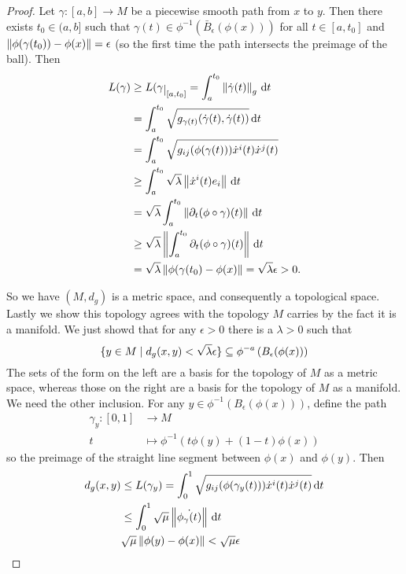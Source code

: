 \documentclass[12pt,twoside]{book}
\begin{document}
\begin{proof}
	Let \( \gamma \colon [a,b] \to M \)	be a piecewise smooth path from \( x \) to \( y
	\). Then there exists \( t_0 \in (a,b] \) such that \( \gamma(t) \in
	\phi^{-1}\left(\bar{B}_\epsilon(\phi(x))\right) \) for all \( t \in [a,t_0] \) and \(
	\left\lVert \phi(\gamma(t_0)) - \phi(x) \right\rVert = \epsilon \) (so the first time the path intersects
	the preimage of the ball). Then
	\begin{align*}
		L(\gamma) & \geq L(\gamma\rest{[a,t_0]} = \int_a^{t_0} \norm{\dot{\gamma}(t)}_g \ud t \\
							& = \int_a^{t_0} \sqrt{g_{\gamma(t)}(\dot{\gamma}(t), \dot{\gamma}(t))} \ud
							t \\
							& = \int_a^{t_0} \sqrt{g_{ij}(\phi(\gamma(t))) \dot{x}^i(t) \dot{x}^j(t) }
							\\
							& \geq \int_a^{t_0} \sqrt{\lambda} \norm{\dot{x}^i(t) e_i} \ud t \\
							& = \sqrt{\lambda} \int_a^{t_0} \norm{\partial_t (\phi \circ \gamma)(t)} \ud
							t \\
							& \geq \sqrt{\lambda} \norm{\int_{a}^{t_0} \partial_t (\phi \circ
							\gamma)(t)} \ud t \\
							& = \sqrt{\lambda} \norm{\phi(\gamma(t_0) - \phi(x)} = \sqrt{\lambda}
							\epsilon > 0. 
	\end{align*}
	
	So we have \( (M,d_g) \) is a metric space, and consequently a topological space. Lastly
	we show this topology agrees with the topology \( M \) carries by the fact it is a
	manifold. We just showd that for any \( \epsilon > 0 \) there is a \( \lambda > 0 \)
	such that
	\begin{equation*}
		\{ y \in M \mid d_g(x,y) < \sqrt{\lambda} \epsilon \} \subseteq
		\phi^{-a}\left(B_\epsilon(\phi(x))\right)
	\end{equation*}
	The sets of the form on the left are a basis for the topology of \( M \) as a metric
	space, whereas those on the right are a basis for the topology of \( M \) as a manifold.
	We need the other inclusion. For any \( y \in \phi^{-1}\left(B_\epsilon(\phi(x))\right)
	\), define the path
	\begin{align*}
		\gamma_y \colon [0,1] & \longrightarrow M \\
		t & \longmapsto \phi^{-1}\left(t\phi(y) + (1-t)\phi(x)\right)
	\end{align*}
	so the preimage of the straight line segment between \( \phi(x) \) and \( \phi(y) \).
	Then
	\begin{align*}
		d_g(x,y) & \leq L(\gamma_y) = \int_0^1 \sqrt{g_{ij}(\phi(\gamma_y(t)))
		\dot{x}^i(t)\dot{x}^j(t)} \, \mathrm{d} t \\
						 & \leq \int_0^1 \sqrt{\mu} \left\lVert \dot{\phi_\gamma(t)} \right\rVert \, \mathrm{d} t \\
						 & \sqrt{\mu} \left\lVert \phi(y) - \phi(x) \right\rVert < \sqrt{\mu} \epsilon
	\end{align*}
\end{proof}
\end{document}
